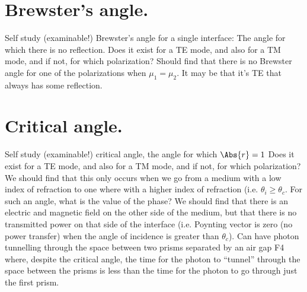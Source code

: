 \section{Brewster's angle.}
%
Self study (examinable!) Brewster's angle for a single interface: The angle for which there is no reflection.
%
Does it exist for a TE mode, and also for a TM mode, and if not, for which polarization?
%
Should find that there is no Brewster angle for one of the polarizations when \( \mu_1 = \mu_2 \).  It may be that it's TE that always has some reflection.
%
\section{Critical angle.}
%
Self study (examinable!) critical angle, the angle for which \( \Abs{r} = 1 \)
%
Does it exist for a TE mode, and also for a TM mode, and if not, for which polarization?
%
We should find that this only occurs when we go from a medium with a low index of refraction to one where with a higher index of refraction (i.e. \( \theta_i \ge \theta_c \).
%
For such an angle, what is the value of the phase?
%
We should find that there is an electric and magnetic field on the other side of the medium, but that there is no transmitted power on that side of the interface (i.e. Poynting vector is zero (no power transfer) when the angle of incidence is greater than \( \theta_c \)).
%
Can have photon tunnelling through the space between two prisms separated by an air gap
%
F4
%
where, despite the critical angle, the time for the photon to ``tunnel'' through the space between the prisms is less than the time for the photon to go through just the first prism.
%
